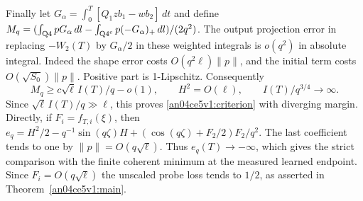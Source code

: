 \documentclass[11pt]{article}
\newcommand{\dd}{\,dl}
\newcommand{\dt}{\,dt}
\newcommand{\norm}[1]{\lVert #1\rVert}
\begin{document}
Finally let $G_\alpha=\int_0^T[Q_1zb_1-w b_2]\dt$ and define
$M_q=(\int_{\rm Q4}pG_\alpha\dd-\int_{{\rm Q4}^c}p(-G_\alpha)_+\dd)/(2q^2)$.
The output projection error in replacing $-W_2(T)$ by $G_\alpha/2$
in these weighted integrals is $o(q^2)$ in absolute integral. Indeed
the shape error costs $O(q^2\ell)\norm p$, and the initial term costs
$O(\sqrt{S_0})\norm p$. Positive part is 1-Lipschitz. Consequently
\[
 M_q\ge c\sqrt\ell\, I(T)/q-o(1),\qquad
 H^2=O(\ell),\qquad I(T)/q^{3/4}\longrightarrow\infty .
\]
Since $\sqrt\ell\,I(T)/q\gg\ell$, this proves \eqref{an04ce5v1:criterion} with diverging margin. Directly, if
$F_i=f_{T,i}(\xi)$, then
$e_q=H^2/2-q^{-1}\sin(q\zeta)H+
(\cos(q\zeta)+F_2/2)F_2/q^2$.
The last coefficient tends to one by $\norm p=O(q\sqrt\ell)$.
Thus $e_q(T)\to-\infty$, which gives the strict comparison with
the finite coherent minimum at the measured learned endpoint. Since $F_i=O(q\sqrt\ell)$ the unscaled probe loss tends to $1/2$, as asserted in Theorem~\ref{an04ce5v1:main}.
\end{document}
